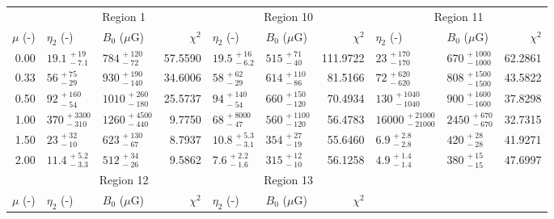 \begin{tabular}{@{}rllr llr llr@{}}

\toprule
{} & \multicolumn{3}{c}{Region 1}
   & \multicolumn{3}{c}{Region 10}
   & \multicolumn{3}{c}{Region 11\tablenotemark{a}} \\
\cmidrule(lr){2-4} \cmidrule(lr){5-7} \cmidrule(lr){8-10}
$\mu$ (-) & $\eta_2$ (-) & $B_0$ ($\mu$G) & $\chi^2$
          & $\eta_2$ (-) & $B_0$ ($\mu$G) & $\chi^2$
          & $\eta_2$ (-) & $B_0$ ($\mu$G) & $\chi^2$ \\

\midrule
0.00 & ${19.1}^{\,+19}_{\,-7.1}$ & ${784}^{\,+120}_{\,-72}$ & 57.5590
     & ${19.5}^{\,+16}_{\,-6.2}$ & ${515}^{\,+71}_{\,-40}$ & 111.9722
     & $23^{\,+170}_{\,-170}$ & $670^{\,+1000}_{\,-1000}$ & 62.2861\\[1.5pt]
0.33 & ${56}^{\,+75}_{\,-29}$ & $930^{\,+190}_{\,-140}$ & 34.6006
     & ${58}^{\,+62}_{\,-29}$ & ${614}^{\,+110}_{\,-86}$ & 81.5166
     & $72^{\,+620}_{\,-620}$ & $808^{\,+1500}_{\,-1500}$ & 43.5822\\[1.5pt]
0.50 & ${92}^{\,+160}_{\,-54}$ & ${1010}^{\,+260}_{\,-180}$ & 25.5737
     & ${94}^{\,+140}_{\,-54}$ & $660^{\,+150}_{\,-120}$ & 70.4934
     & $130^{\,+1040}_{\,-1040}$ & $900^{\,+1600}_{\,-1600}$ & 37.8298\\[1.5pt]
1.00 & ${370}^{\,+3300}_{\,-310}$ & ${1260}^{\,+4500}_{\,-440}$ & 9.7750
     & ${68}^{\,+8000}_{\,-47}$ & $560^{\,+1100}_{\,-120}$ & 56.4783
     & $16000^{\,+21000}_{\,-21000}$ & $2450^{\,+670}_{\,-670}$ & 32.7315\\[1.5pt]
1.50 & ${23}^{\,+32}_{\,-10}$ & ${623}^{\,+130}_{\,-67}$ & 8.7937
     & ${10.8}^{\,+5.3}_{\,-3.1}$ & ${354}^{\,+27}_{\,-19}$ & 55.6460
     & ${6.9}^{\,+2.8}_{\,-2.8}$ & ${420}^{\,+28}_{\,-28}$ & 41.9271\\[1.5pt]
2.00 & ${11.4}^{\,+5.2}_{\,-3.3}$ & ${512}^{\,+34}_{\,-26}$ & 9.5862
     & ${7.6}^{\,+2.2}_{\,-1.6}$ & ${315}^{\,+12}_{\,-10}$ & 56.1258
     & ${4.9}^{\,+1.4}_{\,-1.4}$ & ${380}^{\,+15}_{\,-15}$ & 47.6997\\

\midrule
{} & \multicolumn{3}{c}{Region 12\tablenotemark{a}}
   & \multicolumn{3}{c}{Region 13\tablenotemark{a}} \\
\cmidrule(lr){2-4} \cmidrule(lr){5-7}
$\mu$ (-) & $\eta_2$ (-) & $B_0$ ($\mu$G) & $\chi^2$
          & $\eta_2$ (-) & $B_0$ ($\mu$G) & $\chi^2$ \\


\end{tabular}
